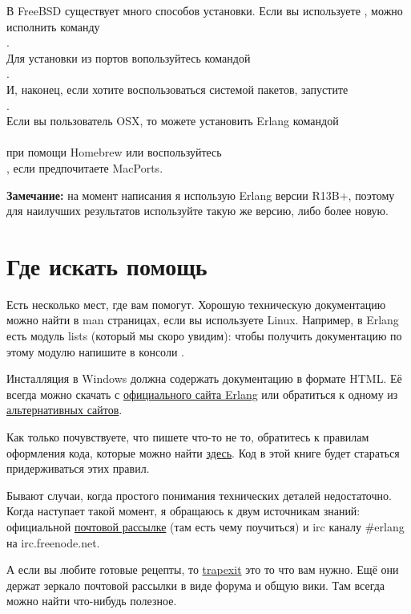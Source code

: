 В FreeBSD существует много способов установки.
Если вы используете , можно исполнить команду\\ 
.\\ 
Для установки из портов вопользуйтесь командой\\ 
.\\ 
И, наконец, если хотите воспользоваться системой пакетов, запустите\\  
.\\ 
Если вы пользователь OSX, то можете установить Erlang командой\\ 
\\ 
при помощи Homebrew или воспользуйтесь\\ 
, если предпочитаете MacPorts.\\ 
\colorbox{lgray}
{
\begin{minipage}{1.0\linewidth}
\textbf{Замечание:} на момент написания я использую Erlang версии R13B+, поэтому для наилучших результатов используйте такую же версию, либо более новую.
\end{minipage}
}
\section{Где искать помощь}
Есть несколько мест, где вам помогут.
Хорошую техническую документацию можно найти в man страницах, если вы используете Linux.
Например, в Erlang есть модуль lists (который мы скоро увидим): чтобы получить документацию по этому модулю напишите в консоли .

Инсталляция в Windows должна содержать документацию в формате HTML.
Её всегда можно скачать с \href{http://erlang.org/doc/}{официального сайта Erlang} или обратиться к одному из \href{http://erldocs.com}{альтернативных сайтов}.

Как только почувствуете, что пишете что\--то не то, обратитесь к правилам оформления кода, которые можно найти \href{http://www.erlang.se/doc/programming_rules.shtml}{здесь}.
Код в этой книге будет стараться придерживаться этих правил.

Бывают случаи, когда простого понимания технических деталей недостаточно.
Когда наступает такой момент, я обращаюсь к двум источникам знаний: официальной \href{http://www.erlang.org/static/doc/mailinglist.html}{почтовой рассылке} (там есть чему поучиться) и irc каналу \#erlang на irc.freenode.net.

А если вы любите готовые рецепты, то \href{http://trapexit.org}{trapexit} это то что вам нужно.
Ещё они держат зеркало почтовой рассылки в виде форума и общую вики.
Там всегда можно найти что\--нибудь полезное.
